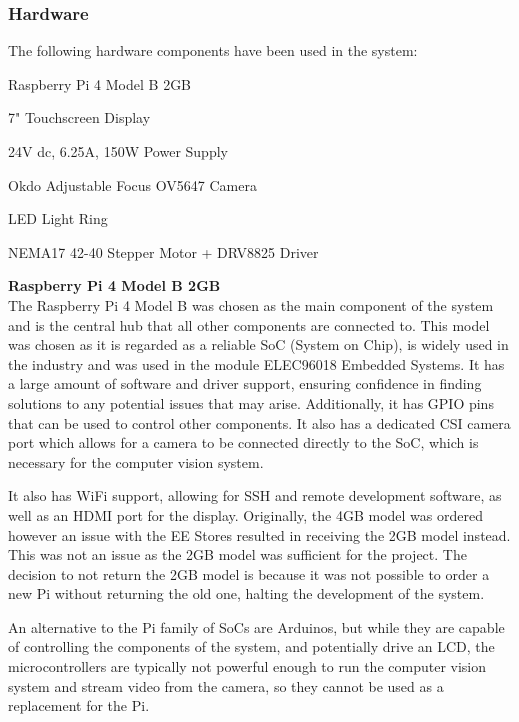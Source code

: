 \subsubsection{Hardware} \label{sec:hardware}
The following hardware components have been used in the system:
\begin{mylist}
  \item Raspberry Pi 4 Model B 2GB \cite{pi4}
  \item 7" Touchscreen Display \cite{7inchdisplay}
  \item 24V dc, 6.25A, 150W Power Supply
  \item Okdo Adjustable Focus OV5647 Camera \cite{okdocamera}
  \item LED Light Ring
  \item NEMA17 42-40 Stepper Motor + DRV8825 Driver
\end{mylist}
\textbf{Raspberry Pi 4 Model B 2GB} \\
The Raspberry Pi 4 Model B was chosen as the main component of the system and is the central hub that all other components are connected to.
This model was chosen as it is regarded as a reliable SoC (System on Chip), is widely used in the industry and was used in the module ELEC96018 Embedded Systems.
It has a large amount of software and driver support, ensuring confidence in finding solutions to any potential issues that may arise. Additionally, 
it has GPIO pins that can be used to control other components. It also has a 
dedicated CSI camera port which allows for a camera to be connected directly to the SoC, which is necessary for the computer vision system.

It also has WiFi support, allowing for SSH and remote development software, as well as an HDMI port for the display.
Originally, the 4GB model was ordered however an issue with the EE Stores resulted in receiving the 2GB model instead.
This was not an issue as the 2GB model was sufficient for the project. The decision to not return the 2GB model is because it was not 
possible to order a new Pi without returning the old one, halting the development of the system.

An alternative to the Pi family of SoCs are Arduinos, but while they are capable of controlling the components of the system,
and potentially drive an LCD, the microcontrollers are typically not powerful enough to run the computer vision system and stream video from the camera,
so they cannot be used as a replacement for the Pi.

